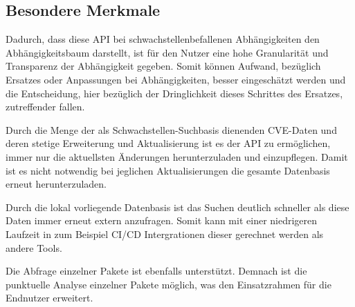 \subsection{Besondere Merkmale} \label{sec:Besondere Merkmale}
    Dadurch, dass diese \ac{API} bei schwachstellenbefallenen Abhängigkeiten den Abhängigkeitsbaum darstellt, ist für den Nutzer eine hohe Granularität und Transparenz der Abhängigkeit gegeben.
    Somit können Aufwand, bezüglich Ersatzes oder Anpassungen bei Abhängigkeiten, besser eingeschätzt werden und die Entscheidung, hier bezüglich der Dringlichkeit dieses Schrittes des Ersatzes, zutreffender fallen.

    Durch die Menge der als Schwachstellen-Suchbasis dienenden \ac{CVE}-Daten und deren stetige Erweiterung und Aktualisierung ist es der \ac{API} zu ermöglichen, immer nur die aktuellsten Änderungen herunterzuladen und einzupflegen.
    Damit ist es nicht notwendig bei jeglichen Aktualisierungen die gesamte Datenbasis erneut herunterzuladen.

    Durch die lokal vorliegende Datenbasis ist das Suchen deutlich schneller als diese Daten immer erneut extern anzufragen.
    Somit kann mit einer niedrigeren Laufzeit in zum Beispiel CI/CD Intergrationen dieser gerechnet werden als andere Tools.

    Die Abfrage einzelner Pakete ist ebenfalls unterstützt.
    Demnach ist die punktuelle Analyse einzelner Pakete möglich, was den Einsatzrahmen für die Endnutzer erweitert.
